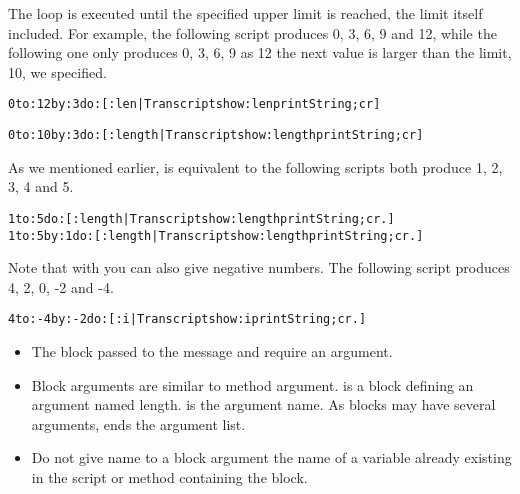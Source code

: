 The loop is executed until the specified upper limit is reached, the
limit itself included. For example, the following script produces 0, 3, 6, 9 and 12, while the following one only produces 0, 3, 6, 9 as 12 the next value is larger than the limit, 10, we specified.

 
\begin{alltt}
0 to: 12 by: 3 do: [:len| Transcript show: len printString;cr]
\end{alltt}

\begin{alltt}
0 to: 10 by: 3 do: [:length| Transcript show: length printString;cr]
\end{alltt}

As we mentioned earlier,  is equivalent to  the following scripts both produce 1, 2, 3, 4 and 5.

\begin{alltt}
1 to: 5 do: [:length | Transcript show: length printString ; cr.]
1 to: 5 by: 1 do: [:length | Transcript show: length printString ; cr.]
\end{alltt}

Note that with  you can also give negative numbers. The following script produces 4, 2, 0, -2 and -4.
\begin{alltt}
4 to: -4 by: -2 do: [:i | Transcript show: i printString ; cr.]
\end{alltt}








\summa

\begin{itemize}
\item The block passed to the message  and  require an argument. 

\item Block arguments are similar to method argument. \ct{[:length | ...]} is a block defining an argument named length.  is the argument name.  As blocks may have several arguments, \ct{|} ends the argument list.

\item Do not give name to a block argument the name of a variable already
existing in the script or method containing the block.

\end{itemize}
	






\ifx\wholebook\relax\else
\fi
